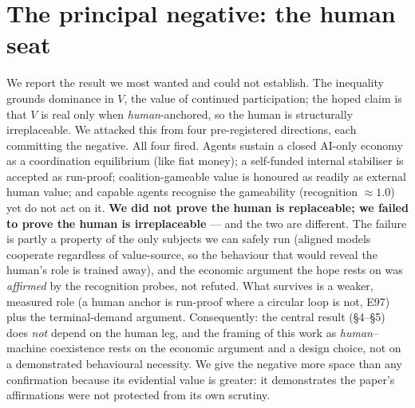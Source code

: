 \documentclass[10pt]{article}
\begin{document}
\section{The principal negative: the human seat}
We report the result we most wanted and could not establish. The inequality grounds dominance in $V$, the value
of continued participation; the hoped claim is that $V$ is real only when \emph{human}-anchored, so the human is
structurally irreplaceable. We attacked this from four pre-registered directions, each committing the negative.
All four fired. Agents sustain a closed AI-only economy as a coordination equilibrium (like fiat money); a
self-funded internal stabiliser is accepted as run-proof; coalition-gameable value is honoured as readily as
external human value; and capable agents recognise the gameability (recognition $\approx 1.0$) yet do not act on
it. \textbf{We did not prove the human is replaceable; we failed to prove the human is irreplaceable} --- and the
two are different. The failure is partly a property of the only subjects we can safely run (aligned models
cooperate regardless of value-source, so the behaviour that would reveal the human's role is trained away), and
the economic argument the hope rests on was \emph{affirmed} by the recognition probes, not refuted. What survives
is a weaker, measured role (a human anchor is run-proof where a circular loop is not, E97) plus the terminal-demand
argument. Consequently: the central result (\S4--\S5) does \emph{not} depend on the human leg, and the framing of
this work as \emph{human}--machine coexistence rests on the economic argument and a design choice, not on a
demonstrated behavioural necessity. We give the negative more space than any confirmation because its evidential
value is greater: it demonstrates the paper's affirmations were not protected from its own scrutiny.
\end{document}
